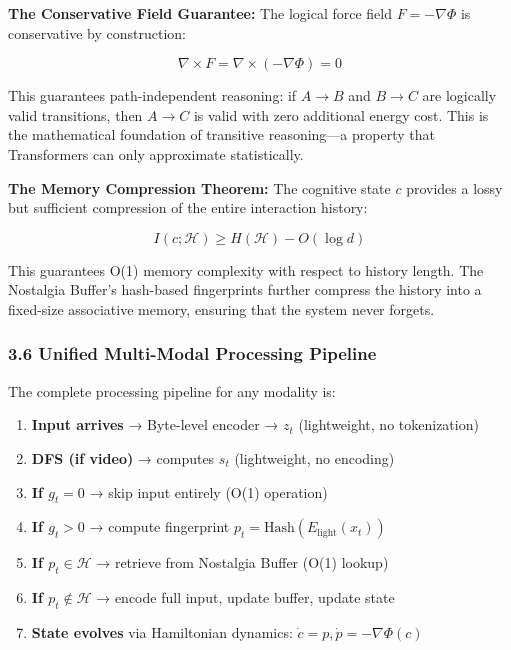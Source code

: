 \documentclass[
  11pt,
  a4paper,
]{article}
\providecommand{\tightlist}{%
  \setlength{\itemsep}{0pt}\setlength{\parskip}{0pt}}
\begin{document}
\textbf{The Conservative Field Guarantee:} The logical force field
\(F = -\nabla\Phi\) is conservative by construction:

\[
\nabla \times F = \nabla \times (-\nabla\Phi) = 0
\]

This guarantees path-independent reasoning: if \(A \to B\) and
\(B \to C\) are logically valid transitions, then \(A \to C\) is valid
with zero additional energy cost. This is the mathematical foundation of
transitive reasoning---a property that Transformers can only approximate
statistically.

\textbf{The Memory Compression Theorem:} The cognitive state \(c\)
provides a lossy but sufficient compression of the entire interaction
history:

\[
I(c; \mathcal{H}) \geq H(\mathcal{H}) - O(\log d)
\]

This guarantees O(1) memory complexity with respect to history length.
The Nostalgia Buffer's hash-based fingerprints further compress the
history into a fixed-size associative memory, ensuring that the system
never forgets.

\subsubsection{3.6 Unified Multi-Modal Processing
Pipeline}\label{unified-multi-modal-processing-pipeline}

The complete processing pipeline for any modality is:

\begin{enumerate}
\def\labelenumi{\arabic{enumi}.}
\tightlist
\item
  \textbf{Input arrives} → Byte-level encoder → \(z_t\) (lightweight, no
  tokenization)
\item
  \textbf{DFS (if video)} → computes \(s_t\) (lightweight, no encoding)
\item
  \textbf{If \(g_t = 0\)} → skip input entirely (O(1) operation)
\item
  \textbf{If \(g_t > 0\)} → compute fingerprint
  \(p_t = \text{Hash}(E_{\text{light}}(x_t))\)
\item
  \textbf{If \(p_t \in \mathcal{H}\)} → retrieve from Nostalgia Buffer
  (O(1) lookup)
\item
  \textbf{If \(p_t \notin \mathcal{H}\)} → encode full input, update
  buffer, update state
\item
  \textbf{State evolves} via Hamiltonian dynamics:
  \(\dot{c} = p, \dot{p} = -\nabla\Phi(c)\)
\end{enumerate}
\end{document}
